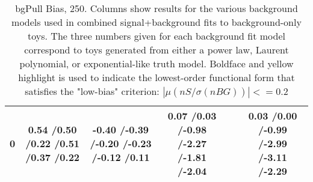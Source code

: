 \documentclass[11pt,final]{article}
\begin{document}
\begin{landscape}
\begin{table}[htb]
\begin{center}
{\begin{tabular}{|c|c|c|c|c|c|}
  \hline 
  0 & 0.54 \slash 0.50 \slash 0.22 \slash 0.51 \slash 0.37 \slash 0.22 & -0.40 \slash -0.39 \slash -0.20 \slash -0.23 \slash -0.12 \slash 0.11 & 0.07 \slash 0.03 \slash -0.98 \slash -2.27 \slash -1.81 \slash -2.04 & \cellcolor{Yellow}{\bf -0.15 \slash -0.14 \slash -0.06 \slash -0.14 \slash -0.04 \slash 0.14} & 0.03 \slash 0.00 \slash -0.99 \slash -2.99 \slash -3.11 \slash -2.29 \\ 
  \hline 
  \end{tabular}%
  }
 \caption{bgPull Bias, 250.  Columns show results for the various background models used in combined signal+background fits to background-only toys.  The three numbers given for each background fit model correspond to toys generated from either a power law, Laurent polynomial, or exponential-like truth model.  Boldface and yellow highlight is used to indicate the lowest-order functional form that satisfies the "low-bias" criterion: $|\mu(nS/\sigma(nBG))|<=0.2$  }
 \label{tab:pull}
 \end{center}
\end{table}
\begin{table}[htb]
 \begin{center}
 \caption{bgPull Bias, 300.  Columns show results for the various background models used in combined signal+background fits to background-only toys.  The three numbers given for each background fit model correspond to toys generated from either a power law, Laurent polynomial, or exponential-like truth model.  Boldface and yellow highlight is used to indicate the lowest-order functional form that satisfies the "low-bias" criterion: $|\mu(nS/\sigma(nBG))|<=0.2$  }

\end{center}
\end{table}
\end{landscape}
\end{document}
